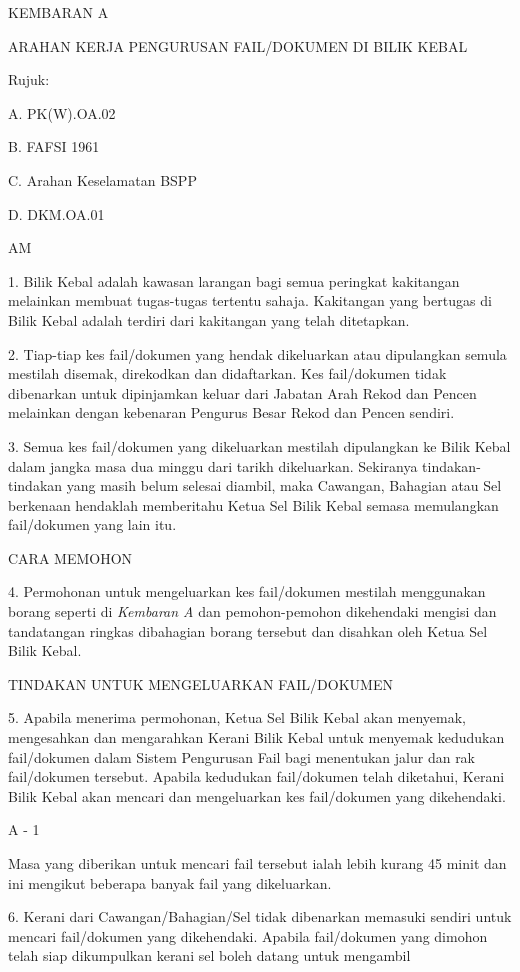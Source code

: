 \documentclass[
]{article}
\begin{document}
{KEMBARAN A}

{ARAHAN KERJA PENGURUSAN FAIL/DOKUMEN DI BILIK KEBAL}

{Rujuk:}

A. PK(W).OA.02

B. FAFSI 1961

C. Arahan Keselamatan BSPP

D. DKM.OA.01

{AM}

1. Bilik Kebal adalah kawasan larangan bagi semua peringkat kakitangan
melainkan membuat tugas-tugas tertentu sahaja. Kakitangan yang bertugas
di Bilik Kebal adalah terdiri dari kakitangan yang telah ditetapkan.

2. Tiap-tiap kes fail/dokumen yang hendak dikeluarkan atau dipulangkan
semula mestilah disemak, direkodkan dan didaftarkan. Kes fail/dokumen
tidak dibenarkan untuk dipinjamkan keluar dari Jabatan Arah Rekod dan
Pencen melainkan dengan kebenaran Pengurus Besar Rekod dan Pencen
sendiri.

3. Semua kes fail/dokumen yang dikeluarkan mestilah dipulangkan ke Bilik
Kebal dalam jangka masa dua minggu dari tarikh dikeluarkan. Sekiranya
tindakan-tindakan yang masih belum selesai diambil, maka Cawangan,
Bahagian atau Sel berkenaan hendaklah memberitahu Ketua Sel Bilik Kebal
semasa memulangkan fail/dokumen yang lain itu.

{CARA MEMOHON}

4. Permohonan untuk mengeluarkan kes fail/dokumen mestilah menggunakan
borang seperti di \emph{Kembaran A} dan pemohon-pemohon dikehendaki
mengisi dan tandatangan ringkas dibahagian borang tersebut dan disahkan
oleh Ketua Sel Bilik Kebal.

{TINDAKAN UNTUK MENGELUARKAN FAIL/DOKUMEN}

5. Apabila menerima permohonan, Ketua Sel Bilik Kebal akan menyemak,
mengesahkan dan mengarahkan Kerani Bilik Kebal untuk menyemak kedudukan
fail/dokumen dalam Sistem Pengurusan Fail bagi menentukan jalur dan rak
fail/dokumen tersebut. Apabila kedudukan fail/dokumen telah diketahui,
Kerani Bilik Kebal akan mencari dan mengeluarkan kes fail/dokumen yang
dikehendaki.

A - 1

Masa yang diberikan untuk mencari fail tersebut ialah lebih kurang 45
minit dan ini mengikut beberapa banyak fail yang dikeluarkan.

6. Kerani dari Cawangan/Bahagian/Sel tidak dibenarkan memasuki sendiri
untuk mencari fail/dokumen yang dikehendaki. Apabila fail/dokumen yang
dimohon telah siap dikumpulkan kerani sel boleh datang untuk mengambil
\end{document}
